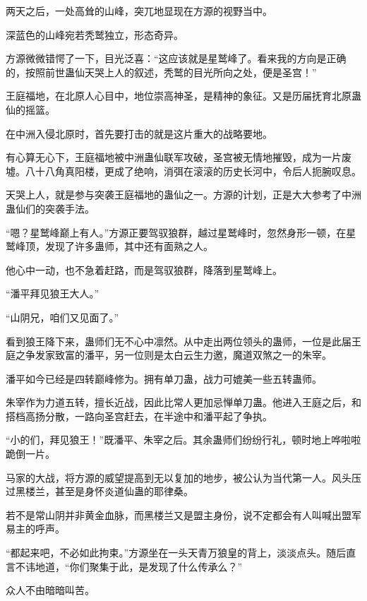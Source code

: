 
\begin{this_body}

两天之后，一处高耸的山峰，突兀地显现在方源的视野当中。

深蓝色的山峰宛若秃鹫独立，形态奇异。

方源微微错愕了一下，目光泛喜：“这应该就是星鹫峰了。看来我的方向是正确的，按照前世蛊仙天哭上人的叙述，秃鹫的目光所向之处，便是圣宫！”

王庭福地，在北原人心目中，地位崇高神圣，是精神的象征。又是历届抚育北原蛊仙的摇篮。

在中洲入侵北原时，首先要打击的就是这片重大的战略要地。

有心算无心下，王庭福地被中洲蛊仙联军攻破，圣宫被无情地摧毁，成为一片废墟。八十八角真阳楼，更成了绝响，消弭在滚滚的历史长河中，令后人扼腕叹息。

天哭上人，就是参与突袭王庭福地的蛊仙之一。方源的计划，正是大大参考了中洲蛊仙们的突袭手法。

“嗯？星鹫峰巅上有人。”方源正要驾驭狼群，越过星鹫峰时，忽然身形一顿，在星鹫峰顶，发现了许多蛊师，其中还有面熟之人。

他心中一动，也不急着赶路，而是驾驭狼群，降落到星鹫峰上。

“潘平拜见狼王大人。”

“山阴兄，咱们又见面了。”

看到狼王降下来，蛊师们无不心中凛然。从中走出两位领头的蛊师，一位是此届王庭之争发家致富的潘平，另一位则是太白云生力邀，魔道双煞之一的朱宰。

潘平如今已经是四转巅峰修为。拥有单刀蛊，战力可媲美一些五转蛊师。

朱宰作为力道五转，擅长近战，因此比常人更加忌惮单刀蛊。他进入王庭之后，和搭档高扬分散，一路向圣宫赶去，在半途中和潘平起了争执。

“小的们，拜见狼王！”既潘平、朱宰之后。其余蛊师们纷纷行礼，顿时地上哗啦啦跪倒一片。

马家的大战，将方源的威望提高到无以复加的地步，被公认为当代第一人。风头压过黑楼兰，甚至是身怀炎道仙蛊的耶律桑。

若不是常山阴并非黄金血脉，而黑楼兰又是盟主身份，说不定都会有人叫喊出盟军易主的呼声。

“都起来吧，不必如此拘束。”方源坐在一头天青万狼皇的背上，淡淡点头。随后直言不讳地道，“你们聚集于此，是发现了什么传承么？”

众人不由暗暗叫苦。


\end{this_body}
